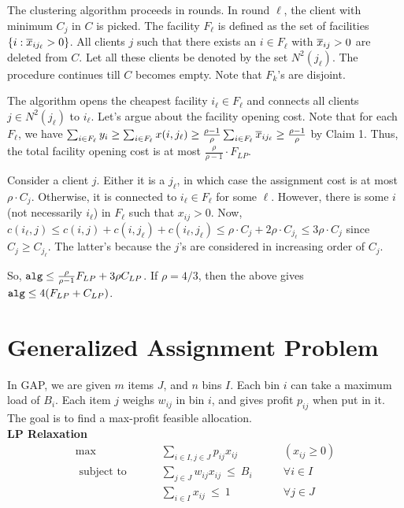 \documentclass[11pt]{article}
\def\alg{{\tt alg}}
\begin{document}
\noindent
The clustering algorithm proceeds in rounds. In round $\ell$, the client with minimum $C_j$ in $C$ is picked.
The facility $F_\ell$ is defined as the set of facilities $\{i: \overline{x}_{ij_\ell} > 0\}$. All clients $j$ such that there exists an $i\in F_\ell$ with $\overline{x}_{ij} > 0$ are deleted from $C$. Let all these clients be denoted by the set $N^2(j_\ell)$.
The procedure continues till $C$ becomes empty. %
 Note that $F_k$'s are disjoint. 

The algorithm opens the cheapest facility $i_\ell \in F_\ell$ and connects all clients $j\in N^2(j_\ell)$ to $i_\ell$.
Let's argue about the facility opening cost. Note that for each $F_\ell$, we have $\sum_{i\in F_\ell} y_i \ge \sum_{i\in F_\ell} x(i,j_\ell) \ge \frac{\rho -1}{\rho} \sum_{i\in F_\ell} \overline{x}_{ij_\ell} \ge \frac{\rho -1}{\rho}$ by Claim 1. Thus, the total facility opening cost is at most $\frac{\rho}{\rho -1}\cdot F_{LP}$.

Consider a client $j$. Either it is a $j_\ell$, in which case the assignment cost is at most $\rho\cdot C_j$.
Otherwise, it is connected to $i_\ell \in F_\ell$ for some $\ell$. However, there is some $i$ (not necessarily $i_\ell$) in $F_\ell$ such that $x_{ij} > 0$. Now, $c(i_\ell,j) \le c(i,j) + c(i,j_\ell) + c(i_\ell,j_\ell) \le \rho\cdot C_j + 2\rho\cdot C_{j_\ell} \le 3\rho\cdot C_j$ since $C_j \ge C_{j_\ell}$. The latter's because the $j$'s are considered in increasing order of $C_j$. 

So, $\alg \le \frac{\rho}{\rho -1}F_{LP} + 3\rho C_{LP}$. If $\rho = 4/3$, then the above gives $\alg \le 4(F_{LP} + C_{LP})$.

\section{Generalized Assignment Problem}
In GAP, we are given $m$ items $J$, and $n$ bins $I$. Each bin $i$ can take a maximum load of 
$B_i$. Each item $j$ weighs $w_{ij}$ in bin $i$, and gives profit $p_{ij}$ when put in it. 
The goal is to find a max-profit feasible allocation. \\

\noindent
{\bf LP Relaxation} 
\begin{align}
\max & \qquad \sum_{i\in I,j\in J}p_{ij}x_{ij}  & \qquad (x_{ij}  \ge 0) \label{lp:gap}\\
\mbox{ subject to } & \qquad \sum_{j\in J} w_{ij} x_{ij} ~\le~ B_i & \qquad \forall i\in I \\
			     & \qquad \sum_{i\in I}  x_{ij} ~\le ~1 & \qquad \forall j \in J
\end{align}
\end{document}
